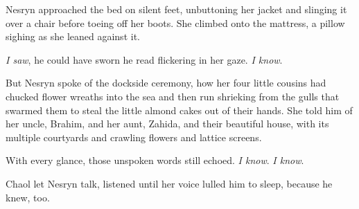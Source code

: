 Nesryn approached the bed on silent feet, unbuttoning her jacket and slinging it over a chair before toeing off her boots.
She climbed onto the mattress, a pillow sighing as she leaned against it.

\emph{I saw}, he could have sworn he read flickering in her gaze.
\emph{I know}.

But Nesryn spoke of the dockside ceremony, how her four little cousins had chucked flower wreaths into the sea and then run shrieking from the gulls that swarmed them to steal the little almond cakes out of their hands.
She told him of her uncle, Brahim, and her aunt, Zahida, and their beautiful house, with its multiple courtyards and crawling flowers and lattice screens.

With every glance, those unspoken words still echoed.
\emph{I know}.
\emph{I know}.

Chaol let Nesryn talk, listened until her voice lulled him to sleep, because he knew, too.

